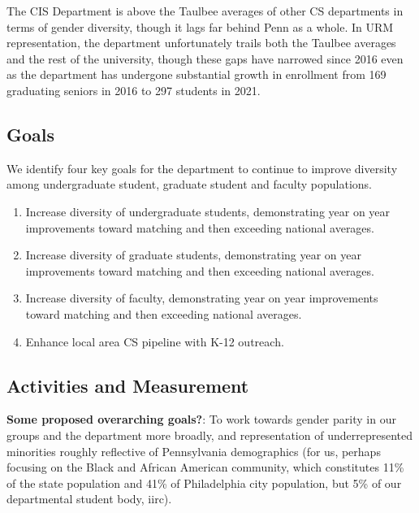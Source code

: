 The CIS Department is above the Taulbee averages of other CS departments in terms of gender diversity, though it lags far behind Penn as a whole. In URM representation, the department unfortunately trails both the Taulbee averages and the rest of the university, though these gaps have narrowed since 2016 even as the department has undergone substantial growth in enrollment from 169 graduating seniors in 2016 to 297 students in 2021.

\subsection*{Goals}

We identify four key goals for the department to continue to improve diversity among undergraduate student, graduate student and faculty populations.
\begin{enumerate}
\item
Increase diversity of undergraduate students, demonstrating year on year improvements toward matching and then exceeding national averages.
\item
Increase diversity of graduate students, demonstrating year on year improvements toward matching and then exceeding national averages.
\item
Increase diversity of faculty, demonstrating year on year improvements toward matching and then exceeding national averages.
\item
Enhance local area CS pipeline with K-12 outreach.
\end{enumerate}

\subsection*{Activities and Measurement}


\textbf{Some proposed overarching goals?}: To work towards gender parity in our
groups and the department more broadly, and representation of underrepresented
minorities roughly reflective of Pennsylvania demographics (for us, perhaps
focusing on the Black and African American community, which constitutes 11\% of
the state population and 41\% of Philadelphia city population, but 5\% of our
departmental student body, iirc).

